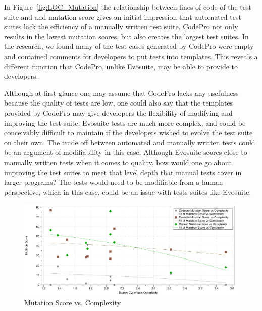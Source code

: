 In Figure~\ref{fig:LOC_Mutation} the relationship between lines of code of the test suite and and mutation score gives an initial impression that automated test suites lack the efficiency of a manually written test suite. CodePro not only results in the lowest mutation scores, but also creates the largest test suites. In the research, we found many of the test cases generated by CodePro were empty and contained comments for developers to put tests into templates. This reveals a different function that CodePro, unlike Evosuite, may be able to provide to developers. 

Although at first glance one may assume that CodePro lacks any usefulness because the quality of tests are low, one could also say that the templates provided by CodePro may give developers the flexibility of modifying and improving the test suite. Evosuite tests are much more complex, and could be conceivably difficult to maintain if the developers wished to evolve the test suite on their own. The trade off between automated and manually written tests could be an argument of modifiability in this case. Although Evosuite scores close to manually written tests when it comes to quality, how would one go about improving the test suites to meet that level depth that manual tests cover in larger programs? The tests would need to be modifiable from a human perspective, which in this case, could be an issue with tests suites like Evosuite.

\begin{figure}[!t]
\centering
  \includegraphics[width=\textwidth]{Complexity_Mutation}
    \caption{Mutation Score vs. Complexity}
  \label{fig:Complexity_Mutation}
\end{figure}


